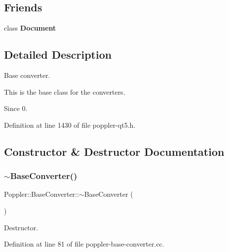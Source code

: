 \subsection*{Friends}
\begin{DoxyCompactItemize}
\item 
\mbox{\label{class_poppler_1_1_base_converter_a883538034e58fc5c0de7d4e4cab3cef7}} 
class {\bfseries Document}
\end{DoxyCompactItemize}


\subsection{Detailed Description}
Base converter. 

This is the base class for the converters.

\begin{DoxySince}{Since}
0. 
\end{DoxySince}


Definition at line 1430 of file poppler-\/qt5.\+h.



\subsection{Constructor \& Destructor Documentation}
\mbox{\label{class_poppler_1_1_base_converter_a10312b1e33c5536c195076bbe423c364}} 
\subsubsection{\texorpdfstring{$\sim$\+Base\+Converter()}{~BaseConverter()}}
{\footnotesize\ttfamily Poppler\+::\+Base\+Converter\+::$\sim$\+Base\+Converter (\begin{DoxyParamCaption}{ }\end{DoxyParamCaption})\hspace{0.3cm}{\ttfamily [virtual]}}

Destructor. 

Definition at line 81 of file poppler-\/base-\/converter.\+cc.



